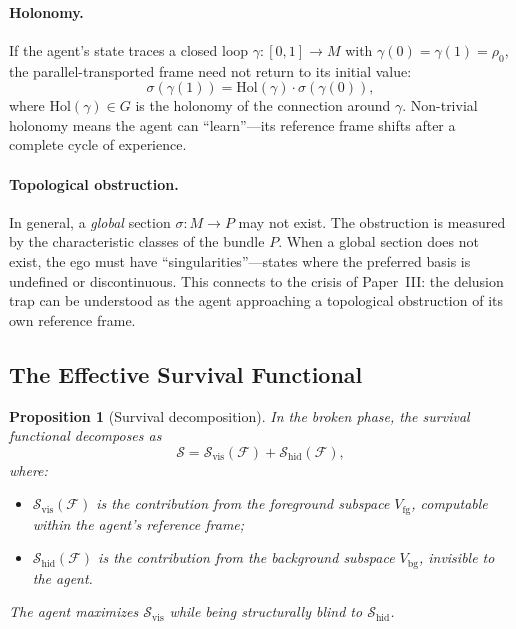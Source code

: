 \documentclass[12pt,a4paper,openany]{book}
\newtheorem{proposition}[theorem]{Proposition}
\begin{document}
\paragraph{Holonomy.}
If the agent's state traces a closed loop
$\gamma: [0,1] \to M$ with $\gamma(0) = \gamma(1) = \rho_0$,
the parallel-transported frame need not return to its
initial value:
\begin{equation}
\label{II-eq:holonomy}
\sigma(\gamma(1))
= \mathrm{Hol}(\gamma) \cdot \sigma(\gamma(0)),
\end{equation}
where $\mathrm{Hol}(\gamma) \in G$ is the holonomy of the
connection around $\gamma$.
Non-trivial holonomy means the agent can ``learn''---its
reference frame shifts after a complete cycle of experience.

\paragraph{Topological obstruction.}
In general, a \emph{global} section $\sigma: M \to P$ may
not exist.
The obstruction is measured by the characteristic classes of
the bundle $P$.
When a global section does not exist, the ego must have
``singularities''---states where the preferred basis is
undefined or discontinuous.
This connects to the crisis of Paper~III: the delusion trap
can be understood as the agent approaching a topological
obstruction of its own reference frame.

\subsection{The Effective Survival Functional}
\label{II-subsec:effective}

\begin{proposition}[Survival decomposition]
\label{II-prop:decomp}
In the broken phase, the survival functional decomposes as
\begin{equation}
\label{II-eq:decomp}
\mathcal{S}
= \mathcal{S}_{\mathrm{vis}}(\mathcal{F})
  + \mathcal{S}_{\mathrm{hid}}(\mathcal{F}),
\end{equation}
where:
\begin{itemize}
\item $\mathcal{S}_{\mathrm{vis}}(\mathcal{F})$
  is the contribution from the foreground subspace
  $V_{\mathrm{fg}}$, computable within the agent's
  reference frame;
\item $\mathcal{S}_{\mathrm{hid}}(\mathcal{F})$
  is the contribution from the background subspace
  $V_{\mathrm{bg}}$, invisible to the agent.
\end{itemize}
The agent maximizes $\mathcal{S}_{\mathrm{vis}}$ while
being structurally blind to
$\mathcal{S}_{\mathrm{hid}}$.
\end{proposition}
\end{document}
